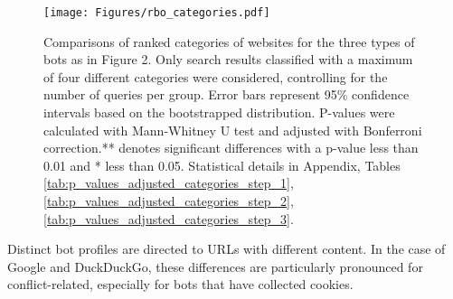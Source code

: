 

\begin{figure}[t]
    \centering    \texttt{[image: Figures/rbo\_categories.pdf]}
    \Description{}
    \caption{Comparisons of ranked categories of websites for the three types of bots as in Figure 2. Only search results classified with a maximum of four different categories were considered, controlling for the number of queries per group. Error bars represent 95\% confidence intervals based on the bootstrapped distribution. P-values were calculated with Mann-Whitney U test and adjusted with Bonferroni correction.** denotes significant differences with a p-value less than 0.01 and * less than 0.05. Statistical details in Appendix, Tables \ref{tab:p_values_adjusted_categories_step_1}, \ref{tab:p_values_adjusted_categories_step_2}, \ref{tab:p_values_adjusted_categories_step_3}.}
    \label{fig:rbo_per_category_website}
\end{figure}


\begin{takeaway}
    \takeawaytitle{}
    Distinct bot profiles are directed to URLs with different content. In the case of Google and DuckDuckGo, these differences are particularly pronounced for conflict-related, especially for bots that have collected cookies.
\end{takeaway}

